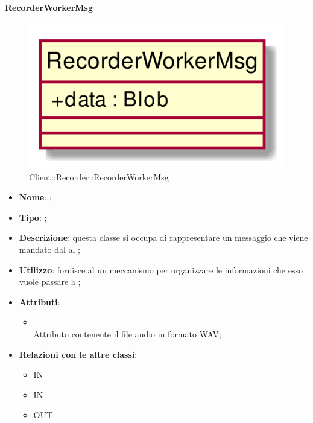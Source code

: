\hypertarget{RecorderWorkerMsg_label}{\paragraph{RecorderWorkerMsg}}
\begin{figure}[h]
	\centering
	\includegraphics[width=\textwidth,height=\textheight,keepaspectratio]{images/ClassRecorderWorkerMsg.png}
	\caption{Client::Recorder::RecorderWorkerMsg}
\end{figure}
\begin{itemize}
	\item \textbf{Nome}: ;
	\item \textbf{Tipo}: ;
	\item \textbf{Descrizione}: questa classe si occupa di rappresentare un messaggio che viene mandato dal  al ;
	\item \textbf{Utilizzo}: fornisce al  un meccanismo per organizzare le informazioni che esso vuole passare a ;
	\item \textbf{Attributi}:
	\begin{itemize}
		\item[]  \\
		Attributo contenente il file audio in formato WAV;
	\end{itemize}
	\item \textbf{Relazioni con le altre classi}:
	\begin{itemize}
		\item IN \hyperlink{RecorderWorker_label}{}
		\item IN \hyperlink{Recorder_label}{}
		\item OUT \hyperlink{RecorderWorkerConfig_label}{}
	\end{itemize}
\end{itemize}

